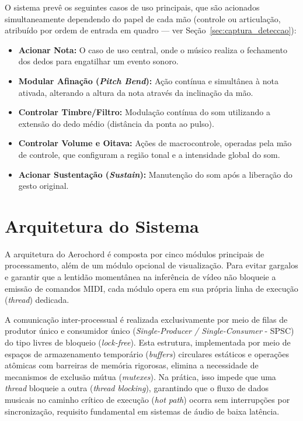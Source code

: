 O sistema prevê os seguintes casos de uso principais, que são acionados simultaneamente dependendo do papel de cada mão (controle ou articulação, atribuído por ordem de entrada em quadro — ver Seção~\ref{sec:captura_deteccao}):
\begin{itemize}
    \item \textbf{Acionar Nota:} O caso de uso central, onde o músico realiza o fechamento dos dedos para engatilhar um evento sonoro.
    \item \textbf{Modular Afinação (\textit{Pitch Bend}):} Ação contínua e simultânea à nota ativada, alterando a altura da nota através da inclinação da mão.
    \item \textbf{Controlar Timbre/Filtro:} Modulação contínua do som utilizando a extensão do dedo médio (distância da ponta ao pulso).
    \item \textbf{Controlar Volume e Oitava:} Ações de macrocontrole, operadas pela mão de controle, que configuram a região tonal e a intensidade global do som.
    \item \textbf{Acionar Sustentação (\textit{Sustain}):} Manutenção do som após a liberação do gesto original.
\end{itemize}

\section{Arquitetura do Sistema}
\label{sec:arquitetura_concorrencia}

A arquitetura do Aerochord é composta por cinco módulos principais de processamento, além de um módulo opcional de visualização. Para evitar gargalos e garantir que a lentidão momentânea na inferência de vídeo não bloqueie a emissão de comandos MIDI, cada módulo opera em sua própria linha de execução (\textit{thread}) dedicada.

A comunicação inter-processual é realizada exclusivamente por meio de filas de produtor único e consumidor único (\textit{Single-Producer / Single-Consumer} - SPSC) do tipo livres de bloqueio (\textit{lock-free}). Esta estrutura, implementada por meio de espaços de armazenamento temporário (\textit{buffers}) circulares estáticos e operações atômicas com barreiras de memória rigorosas, elimina a necessidade de mecanismos de exclusão mútua (\textit{mutexes}). Na prática, isso impede que uma \textit{thread} bloqueie a outra (\textit{thread blocking}), garantindo que o fluxo de dados musicais no caminho crítico de execução (\textit{hot path}) ocorra sem interrupções por sincronização, requisito fundamental em sistemas de áudio de baixa latência.

